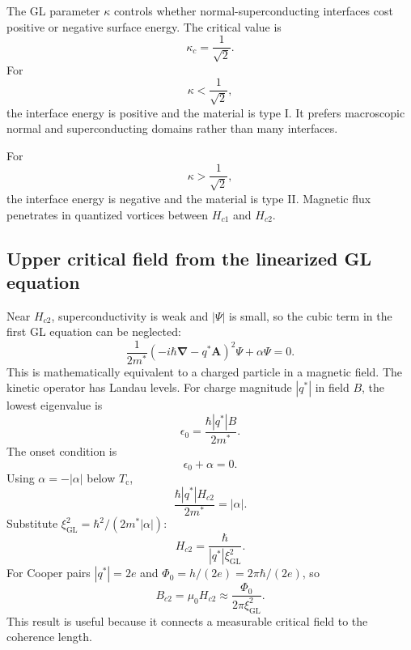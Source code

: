 \documentclass[11pt]{article}
\numberwithin{equation}{section}
\newcommand{\Avec}{\bm{A}}
\renewcommand{\grad}{\bm{\nabla}}
\newcommand{\Tc}{T_{\mathrm{c}}}
\newcommand{\xiGL}{\xi_{\mathrm{GL}}}
\newcommand{\Phizero}{\Phi_0}
\newcommand{\Ord}{\Psi}
\begin{document}
The GL parameter $\kappa$ controls whether normal-superconducting interfaces cost positive or negative surface energy. The critical value is
\begin{equation}
\boxed{\kappa_c=\frac{1}{\sqrt{2}}.}
\end{equation}
For
\begin{equation}
\kappa<\frac{1}{\sqrt{2}},
\end{equation}
the interface energy is positive and the material is type I. It prefers macroscopic normal and superconducting domains rather than many interfaces.

For
\begin{equation}
\kappa>\frac{1}{\sqrt{2}},
\end{equation}
the interface energy is negative and the material is type II. Magnetic flux penetrates in quantized vortices between $H_{c1}$ and $H_{c2}$.

\subsection{Upper critical field from the linearized GL equation}

Near $H_{c2}$, superconductivity is weak and $|\Ord|$ is small, so the cubic term in the first GL equation can be neglected:
\begin{equation}
\frac{1}{2m^*}\left(-i\hbar\grad-q^*\Avec\right)^2\Ord+\alpha\Ord=0.
\end{equation}
This is mathematically equivalent to a charged particle in a magnetic field. The kinetic operator has Landau levels. For charge magnitude $|q^*|$ in field $B$, the lowest eigenvalue is
\begin{equation}
\epsilon_0=\frac{\hbar |q^*|B}{2m^*}.
\end{equation}
The onset condition is
\begin{equation}
\epsilon_0+\alpha=0.
\end{equation}
Using $\alpha=-|\alpha|$ below $\Tc$,
\begin{equation}
\frac{\hbar |q^*|H_{c2}}{2m^*}=|\alpha|.
\end{equation}
Substitute $\xiGL^2=\hbar^2/(2m^*|\alpha|)$:
\begin{equation}
H_{c2}=\frac{\hbar}{|q^*|\xiGL^2}.
\end{equation}
For Cooper pairs $|q^*|=2e$ and $\Phizero=h/(2e)=2\pi\hbar/(2e)$, so
\begin{equation}
\boxed{B_{c2}=\mu_0H_{c2}\approx \frac{\Phizero}{2\pi\xiGL^2}.}
\label{eq:Hc2}
\end{equation}
This result is useful because it connects a measurable critical field to the coherence length.
\end{document}
